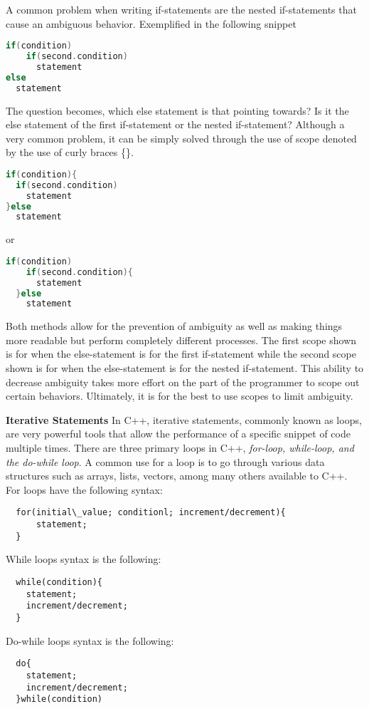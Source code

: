 \documentclass[12pt]{article}
\begin{document}
A common problem when writing if-statements are the nested if-statements that cause an ambiguous behavior. Exemplified in the following snippet
\begin{lstlisting}[language=C++]
  if(condition)
    if(second.condition)
      statement
else
  statement
\end{lstlisting}
The question becomes, which else statement is that pointing towards? Is it the else statement of the first if-statement or the nested if-statement? Although a very common problem, it can be simply solved through the use of scope denoted by the use of curly braces \{\}.
\begin{lstlisting}[language=C++]
if(condition){
  if(second.condition)
    statement
}else
  statement
\end{lstlisting}
or
\begin{lstlisting}[language=C++]
  if(condition)
    if(second.condition){
      statement
  }else
    statement
  \end{lstlisting}
Both methods allow for the prevention of ambiguity as well as making things more readable but perform completely different processes. The first scope shown is for when the else-statement is for the first if-statement while the second scope shown is for when the else-statement is for the nested if-statement. This ability to decrease ambiguity takes more effort on the part of the programmer to scope out certain behaviors. Ultimately, it is for the best to use scopes to limit ambiguity.

\textbf{Iterative Statements} In C++, iterative statements, commonly known as loops, are very powerful tools that allow the performance of a specific snippet of code multiple times. There are three primary loops in C++, \textit{for-loop, while-loop, and the do-while loop}. A common use for a loop is to go through various data structures such as arrays, lists, vectors, among many others available to C++. For loops have the following syntax:
\begin{lstlisting}
  for(initial\_value; conditionl; increment/decrement){
      statement;
  }
\end{lstlisting}
While loops syntax is the following:
\begin{lstlisting}
  while(condition){
    statement;
    increment/decrement;
  }
\end{lstlisting}
Do-while loops syntax is the following:
\begin{lstlisting}
  do{
    statement;
    increment/decrement;
  }while(condition)
\end{lstlisting}
\end{document}
